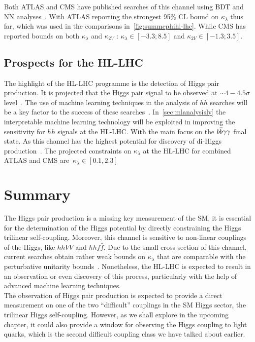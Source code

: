 Both ATLAS and CMS have published searches of this channel using  BDT and NN analyses~\cite{ATLAS:2021jki,CMS:2020tkr}. With ATLAS reporting the strongest 95\% CL bound on $\kappa_\lambda$ thus far, which was used in the comparisons in~\autoref{fig:summcphihl-lhc}. While CMS has reported bounds on both $\kappa_\lambda$ and $\kappa_{2V}$ : $\kappa_{\lambda} \in [-3.3;8.5]$ and $\kappa_{2V} \in [-1.3; 3.5]$.                                                                                       
\subsection{Prospects for the HL-LHC}
The highlight of the HL-LHC programme is the detection of Higgs pair production. It is projected that the Higgs pair signal to be observed at $\sim  4- 4.5\sigma $ level~\cite{DiMicco:2019ngk}. The use of machine learning techniques in the analysis of $hh$ searches will be a key factor to the success of these searches~\cite{Cepeda:2019klc}. In~\autoref{sec:mlanalysisly} the interpretable machine learning technology will be exploited in improving the sensitivity for $hh$ signals at the HL-LHC. With the main focus on the $b\overline b\gamma\gamma$ final state. As this channel has the highest potential for discovery of di-Higgs production~\cite{Azatov:2015oxa, Baur:2003gp, Baglio:2012np, Kling:2016lay, Barger:2013jfa, Adhikary:2017jtu,Alves:2017ued}. The projected constraints on $\kappa_\lambda$ at the HL-LHC for combined ATLAS and CMS are~$\kappa_{\lambda} \in [0.1,2.3]$~\cite{DiMicco:2019ngk,Cepeda:2019klc}
 
\section{Summary \label{summtrilinear}  }
The Higgs pair production is a missing key measurement of the SM, it is essential for the determination of the Higgs potential by directly constraining the Higgs trilinear self-coupling. Moreover, this channel is sensitive to non-linear couplings of the Higgs, like $hhVV$ and $hh f\bar f$. Due to the small cross-section of this channel, current searches obtain rather weak bounds on $\kappa_{\lambda}$ that are comparable with the perturbative unitarity bounds~\cite{DiLuzio:2017tfn}. Nonetheless, the HL-LHC is expected to result in an observation or even discovery of this process, particularly with the help of advanced machine learning techniques.\\ The observation of Higgs pair production is expected to provide a direct measurement on one of the two ``difficult'' couplings in the SM Higgs sector,  the trilinear Higgs self-coupling. However, as we shall explore in the upcoming chapter, it could also provide a window for observing the Higgs coupling to light quarks, which is the second difficult coupling class we have talked about earlier.
